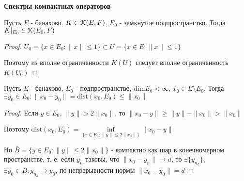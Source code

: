 \documentclass[a4paper,12pt]{report}
\begin{document}
\Large

\textbf{Спектры компактных операторов}
\large
 

\begin{lem}
Пусть $E$ - банахово, $K\in\EuScript K(E,F)$, $E_0$ - замкнутое подпространство. Тогда $K|_{E_0}\in\EuScript K(E_0,F)$
\end{lem}
\begin{proof}
$U_0=\{x\in E_0\colon\|x\|\le1\}\subset U=\{x\in E\colon\|x\|\le1\}$

Поэтому из вполне ограниченности $K(U)$ следует вполне ограниченность $K(U_0)$
\end{proof}
 


\begin{lem}
Пусть $E$ - банахово, $E_0$ - подпространство, $\mathrm{dim}E_0<\infty$, $x_0\in E\setminus E_0$. Тогда $\exists y_0\in E_0\colon\|x_0-y_0\|=\mathrm{dist}(x_0,E_0)\le\|x_0\|$
\end{lem}
\begin{proof}
Если $y\in E_0$, $\|y\|>2\|x_0\|$, то $\|x_0-y\|\ge\|y\|-\|x_0\|>\|x_0\|$

Поэтому $\mathrm{dist}(x_0,E_0)=\inf\limits_{\{x\in E_0\colon\|y\|\le2\|x_0\|\}}\|x_0-y\|$

Но $\bar B=\{y\in E_0\colon\|y\|\le2\|x_0\|\}$ - компактно как шар в конечномерном пространстве, т. е. если $y_n$ таковы, что $\|x_0-y_n\|\to d$, то $\exists\{y_{n_k}\}$, ${\exists y_0\in\bar B\colon} y_{n_k}\to y_0$, по непрерывности нормы $\|x_0-y_0\|=d$
\end{proof}
 
\end{document}

